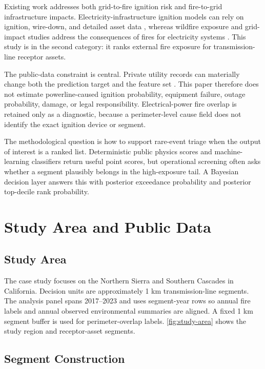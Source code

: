 \documentclass[11pt]{article}
\begin{document}
Existing work addresses both grid-to-fire ignition risk and fire-to-grid
infrastructure impacts. Electricity-infrastructure ignition models can rely on
ignition, wire-down, and detailed asset data \citep{yao2022electricityWildfire},
whereas wildfire exposure and grid-impact studies address the consequences of
fires for electricity systems
\citep{dale2018californiaGrid,panossianElgindy2023wildfire}. This study is in
the second category: it ranks external fire exposure for transmission-line
receptor assets.

The public-data constraint is central. Private utility records can materially
change both the prediction target and the feature set
\citep{yao2022electricityWildfire}. This paper therefore does not estimate
powerline-caused ignition probability, equipment failure, outage probability,
damage, or legal responsibility. Electrical-power fire overlap is retained only
as a diagnostic, because a perimeter-level cause field does not identify the
exact ignition device or segment.

The methodological question is how to support rare-event triage when the output
of interest is a ranked list. Deterministic public physics scores and
machine-learning classifiers return useful point scores, but operational
screening often asks whether a segment plausibly belongs in the high-exposure
tail. A Bayesian decision layer answers this with posterior exceedance
probability and posterior top-decile rank probability.

\section{Study Area and Public Data}

\subsection{Study Area}

The case study focuses on the Northern Sierra and Southern Cascades in
California. Decision units are approximately 1 km transmission-line segments.
The analysis panel spans 2017--2023 and uses segment-year rows so annual fire
labels and annual observed environmental summaries are aligned. A fixed 1 km
segment buffer is used for perimeter-overlap labels. \autoref{fig:study-area}
shows the study region and receptor-asset segments.

\subsection{Segment Construction}
\end{document}
